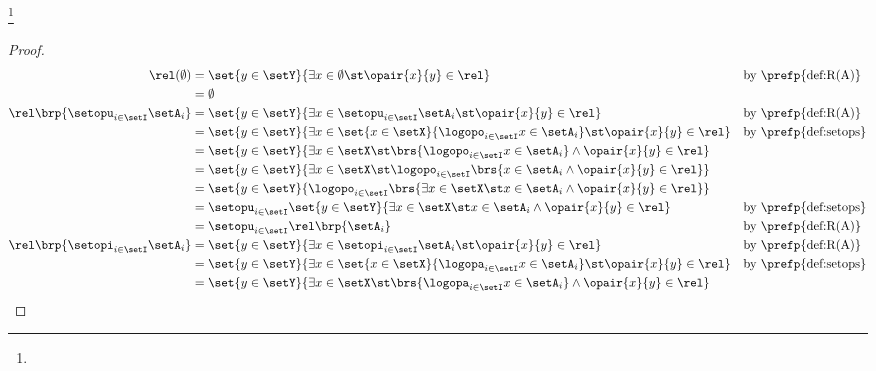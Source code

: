 {%
\begin{theorem}
\footnote{
  }
\end{theorem}
\begin{proof}
\begin{align*}
  \rel(\emptyset)
    &= \set{y\in\setY}{\exists x\in\emptyset \st \opair{x}{y}\in\rel}
    && \text{by \prefp{def:R(A)}}
  \\&= \emptyset
  \\
  \rel\brp{\setopu_{i\in\setI}\setA_i}
    &= \set{y\in\setY}{\exists x\in\setopu_{i\in\setI}\setA_i \st \opair{x}{y}\in\rel}
    && \text{by \prefp{def:R(A)}}
  \\&= \set{y\in\setY}{\exists x\in\set{x\in\setX}{\logopo_{i\in\setI}x\in\setA_i} \st \opair{x}{y}\in\rel}
    && \text{by \prefp{def:setops}}
  \\&= \set{y\in\setY}{\exists x\in\setX \st \brs{\logopo_{i\in\setI}x\in\setA_i} \land \opair{x}{y}\in\rel}
  \\&= \set{y\in\setY}{\exists x\in\setX \st \logopo_{i\in\setI}\brs{x\in\setA_i \land \opair{x}{y}\in\rel}}
  \\&= \set{y\in\setY}{\logopo_{i\in\setI}\brs{\exists x\in\setX \st x\in\setA_i \land \opair{x}{y}\in\rel}}
  \\&= \setopu_{i\in\setI}\set{y\in\setY}{\exists x\in\setX \st x\in\setA_i \land \opair{x}{y}\in\rel}
    && \text{by \prefp{def:setops}}
  \\&= \setopu_{i\in\setI}\rel\brp{\setA_i}
    && \text{by \prefp{def:R(A)}}
  \\
  \rel\brp{\setopi_{i\in\setI}\setA_i}
    &= \set{y\in\setY}{\exists x\in\setopi_{i\in\setI}\setA_i \st \opair{x}{y}\in\rel}
    && \text{by \prefp{def:R(A)}}
  \\&= \set{y\in\setY}{\exists x\in\set{x\in\setX}{\logopa_{i\in\setI}x\in\setA_i} \st \opair{x}{y}\in\rel}
    && \text{by \prefp{def:setops}}
  \\&= \set{y\in\setY}{\exists x\in\setX \st \brs{\logopa_{i\in\setI}x\in\setA_i} \land \opair{x}{y}\in\rel}

\end{align*}
\end{proof}}
